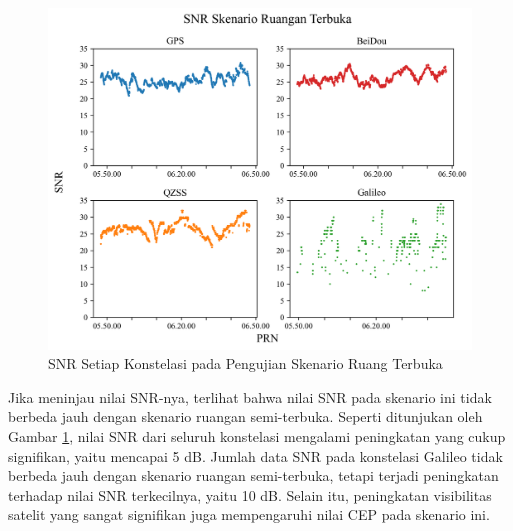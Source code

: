 \begin{figure}[H]
	\centering
	\includegraphics[width=13cm]{contents/chapter-4/4-skenario-outdoor/snr.png}
	\caption{SNR Setiap Konstelasi pada Pengujian Skenario Ruang Terbuka}
	\label{Fig: outdoor-snr}
\end{figure}

Jika meninjau nilai SNR-nya, terlihat bahwa nilai SNR pada skenario ini tidak berbeda jauh dengan skenario ruangan semi-terbuka. Seperti ditunjukan oleh Gambar \ref{Fig: outdoor-snr}, nilai SNR dari seluruh konstelasi mengalami peningkatan yang cukup signifikan, yaitu mencapai 5 dB. Jumlah data SNR pada konstelasi Galileo tidak berbeda jauh dengan skenario ruangan semi-terbuka, tetapi terjadi peningkatan terhadap nilai SNR terkecilnya, yaitu 10 dB. Selain itu, peningkatan visibilitas satelit yang sangat signifikan juga mempengaruhi nilai CEP pada skenario ini. 

